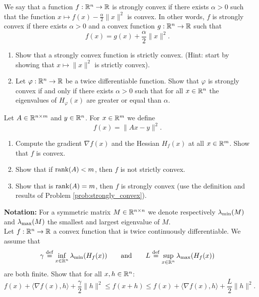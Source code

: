 \documentclass[11pt,nocut]{article}
\begin{document}
\begin{problem}[3 points]\label{prob:strongly_convex}
	We say that a function $f: \mathbb{R}^n \to \mathbb{R}$ is strongly convex if there exists $\alpha >0$ such that the function $x \mapsto f(x) - \frac{\alpha}{2} \|x\|^2$ is convex. In other words, $f$ is strongly convex if there exists $\alpha > 0$ and a convex function $g: \mathbb{R}^n \to \mathbb{R}$ such that 
	$$
	f(x) = g(x) + \frac{\alpha}{2} \|x\|^2.
	$$
	
	\begin{enumerate}[label=\normalfont(\textbf{\alph*})]
		\item Show that a strongly convex function is strictly convex. (Hint: start by showing that $x \mapsto \|x\|^2$ is strictly convex).
		\item Let $\varphi:\mathbb{R}^n \to \mathbb{R}$ be a twice differentiable function. Show that $\varphi$ is strongly convex if and only if there exists $\alpha >0$ such that for all $x \in \mathbb{R}^n$ the eigenvalues of $H_{\varphi}(x)$ are greater or equal than $\alpha$.
	\end{enumerate}
\end{problem}


\vspace{4mm}

\begin{problem}[3 points]
	Let $A \in \mathbb{R}^{n \times m}$ and $y \in \mathbb{R}^n$.
	For $x \in \mathbb{R}^m$ we define
	$$
	f(x) = \|Ax-y\|^2.
	$$
	\begin{enumerate}[label=\normalfont(\textbf{\alph*})]
		\item Compute the gradient $\nabla f(x)$ and the Hessian $H_f(x)$ at all $x \in \mathbb{R}^m$. Show that $f$ is convex.
		\item Show that if ${{\rm rank}}(A)<m$, then $f$ is not strictly convex.
		\item Show that is ${{\rm rank}}(A)=m$, then $f$ is strongly convex (use the definition and results of Problem \ref{prob:strongly_convex}).
	\end{enumerate}
\end{problem}

\vspace{4mm}

\begin{problem}[$\star$]
	\textbf{Notation:} For a symmetric matrix $M \in \mathbb{R}^{n \times n}$ we denote respectively $\lambda_{\rm min}(M)$ and $\lambda_{\rm max}(M)$ the smallest and largest eigenvalue of $M$.
	\\

	Let $f: \mathbb{R}^n \to \mathbb{R}$ a convex function that is twice continuously differentiable. We assume that 
	$$
	\gamma \overset{\rm def}{=} \inf_{x \in \mathbb{R}^n} \lambda_{\rm min}(H_f(x))
	\qquad \text{and} \qquad
	L \overset{\rm def}{=} \sup_{x \in \mathbb{R}^n} \lambda_{\rm max}(H_f(x))
	$$
	are both finite. Show that for all $x,h \in \mathbb{R}^n$:
	$$
	f(x) + \langle \nabla f(x), h \rangle + \frac{\gamma}{2} \|h\|^2
	\leq f(x+h)
	\leq
	f(x) + \langle \nabla f(x), h \rangle + \frac{L}{2} \|h\|^2.
	$$

\end{problem}

\vspace{1cm}
\centerline{}

%
%
\end{document}

